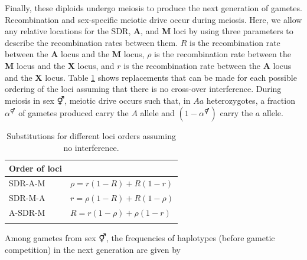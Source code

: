 \documentclass[12pt]{article}
\begin{document}
Finally, these diploids undergo meiosis to produce the next generation of gametes. 
Recombination and sex-specific meiotic drive occur during meiosis.
Here, we allow any relative locations for the SDR, \textbf{A}, and \textbf{M} loci by using three parameters to describe the recombination rates between them. 
$R$ is the recombination rate between the \textbf{A} locus and the \textbf{M} locus, $\rho$ is the recombination rate between the \textbf{M} locus and the \textbf{X} locus, and $r$ is the recombination rate between the \textbf{A} locus and the \textbf{X} locus. 
Table \ref{tab:chisubstitutions} shows replacements that can be made for each possible ordering of the loci assuming that there is no cross-over interference.
During meiosis in sex $\Hermaphrodite$, meiotic drive occurs such that, in $Aa$ heterozygotes, a fraction $\alpha^{\Hermaphrodite}$ of gametes produced carry the $A$ allele and $(1-\alpha^\Hermaphrodite)$ carry the $a$ allele. 

\begin{table}[ht]
\centering
\smallskip
\caption{
Substitutions for different loci orders assuming no interference. %
}
\begin{tabular}{l l}
\hline\hline
  Order of loci &   \\ [0.5ex] \hline
  SDR-A-M & $\rho=r(1-R)+R(1-r)$  \\
  SDR-M-A & $r=\rho(1-R)+R(1-\rho)$ \\ %
  A-SDR-M & $R=r(1-\rho)+\rho(1-r)$ \\ %
  \hline \hline
  \label{tab:chisubstitutions}
 \end{tabular}
\end{table}

Among gametes from sex $\Hermaphrodite$, the frequencies of haplotypes (before gametic competition) in the next generation are given by
\end{document}
